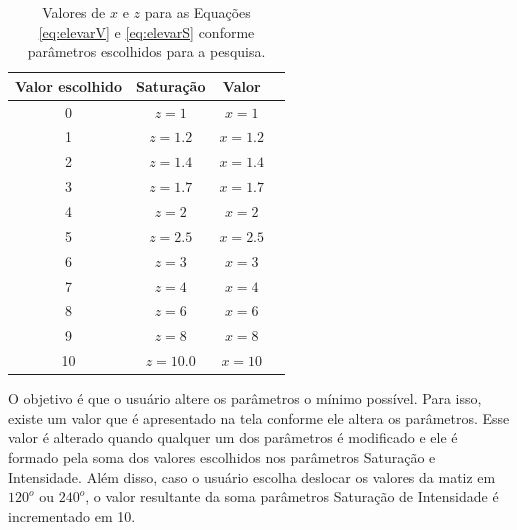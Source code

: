 \documentclass[	12pt, Times, openright, twoside, a4paper, english, brazil]{abntex2}
\begin{document}
\begin{table}[ht]
\centering
\begin{tabular}{cccc}
\hline      
\textbf{Valor escolhido} & \textbf{Saturação} & \textbf{Valor}     \\ \hline
0                        & $z = 1$            &  $x = 1$                          \\ \hline
1                        & $z = 1.2$          &  $x = 1.2$                          \\ \hline
2                        & $z = 1.4$          &  $x = 1.4$                          \\ \hline 
3                        & $z = 1.7$          &  $x = 1.7$                          \\ \hline
4                        & $z = 2$            &  $x = 2$                            \\ \hline
5                        & $z = 2.5$          &  $x = 2.5$                           \\ \hline
6                        & $z = 3$            &  $x = 3$                           \\ \hline
7                        & $z = 4$            &  $x = 4$                           \\ \hline
8                        & $z = 6$            &  $x = 6$                           \\ \hline
9                        & $z = 8$            &  $x = 8$                           \\ \hline
10                       & $z = 10.0$         &  $x = 10$                           \\ \hline

\end{tabular}
\caption{Valores de $x$ e $z$ para as Equações \ref{eq:elevarV} e \ref{eq:elevarS} conforme parâmetros escolhidos para a pesquisa.}
\label{tab:parametrosPesquisa}
\end{table}

O objetivo é que o usuário altere os parâmetros o mínimo possível. Para isso, existe um valor que é apresentado na tela conforme ele altera os parâmetros. Esse valor é alterado quando qualquer um dos parâmetros é modificado e ele é formado pela soma dos valores escolhidos nos parâmetros Saturação e Intensidade. Além disso, caso o usuário escolha deslocar os valores da matiz em $120^o$ ou $240^o$, o valor resultante da soma parâmetros Saturação de Intensidade é incrementado em 10.
\end{document}
